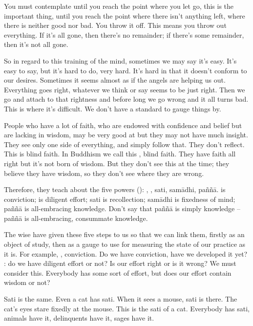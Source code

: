You must contemplate until you reach the point where you let go, this is the important thing, until you reach the point where there isn't anything left, where there is neither good nor bad. You throw it off. This means you throw out everything. If it's all gone, then there's no remainder; if there's some remainder, then it's not all gone. 

So in regard to this training of the mind, sometimes we may say it's easy. It's easy to say, but it's hard to do, very hard. It's hard in that it doesn't conform to our desires. Sometimes it seems almost as if the angels are helping us out. Everything goes right, whatever we think or say seems to be just right. Then we go and attach to that rightness and before long we go wrong and it all turns bad. This is where it's difficult. We don't have a standard to gauge things by. 

People who have a lot of faith, who are endowed with confidence and belief but are lacking in wisdom, may be very good at  but they may not have much insight. They see only one side of everything, and simply follow that. They don't reflect. This is blind faith. In Buddhism we call this , blind faith. They have faith all right but it's not born of wisdom. But they don't see this at the time; they believe they have wisdom, so they don't see where they are wrong. 

Therefore, they teach about the five powers (): , , sati, sam\=adhi, pa\~n\~n\=a.  is conviction;  is diligent effort; sati is recollection; sam\=adhi is fixedness of mind; pa\~n\~n\=a is all-embracing knowledge. Don't say that pa\~n\~n\=a is simply knowledge -- pa\~n\~n\=a is all-embracing, consummate knowledge. 

The wise have given these five steps to us so that we can link them, firstly as an object of study, then as a gauge to use for measuring the state of our practice as it is. For example, , conviction. Do we have conviction, have we developed it yet? : do we have diligent effort or not? Is our effort right or is it wrong? We must consider this. Everybody has some sort of effort, but does our effort contain wisdom or not? 

Sati is the same. Even a cat has sati. When it sees a mouse, sati is there. The cat's eyes stare fixedly at the mouse. This is the sati of a cat. Everybody has sati, animals have it, delinquents have it, sages have it. 


